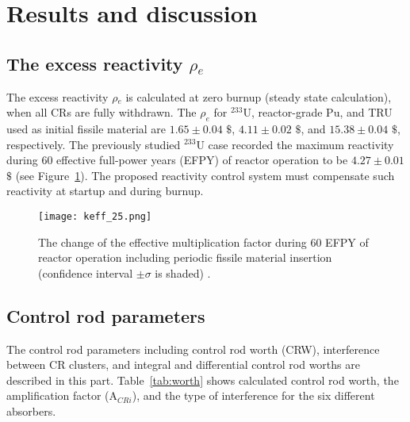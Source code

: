 \section{Results and discussion} \label{Results-and-discussion}

\subsection{The excess reactivity $\rho$$_e$}

The excess reactivity $\rho$$_e$ is calculated at zero burnup (steady state 
calculation), when all CRs are fully withdrawn. The $\rho_e$ for $^{233}$U, 
reactor-grade Pu, and TRU used as initial fissile material are $1.65\pm0.04$ 
$\$$, $4.11\pm0.02$ $\$$, and $15.38\pm0.04$ $\$$, respectively.
The previously studied $^{233}$U case recorded the maximum reactivity
during 60 effective full-power years (EFPY) of reactor operation to be 
$4.27\pm0.01$ $\$$ (see Figure~\ref{fig:keff_25}).
The proposed reactivity control system must compensate such reactivity at startup and during burnup.
\begin{figure}
	\centering
	\texttt{[image: keff\_25.png]}
	\vspace{-0.5in}
	\caption{The change of the effective multiplication factor during 60 EFPY of reactor operation including periodic fissile material insertion (confidence interval $\pm\sigma$ is shaded) \cite{ashraf2020whole}.} 
	\label{fig:keff_25}
\end{figure}

\subsection{Control rod parameters}

The control rod parameters including control rod worth (CRW), interference 
between CR clusters, and integral and differential control rod worths are 
described in this part. 
Table~\ref{tab:worth} shows calculated control rod worth, the amplification 
factor (A$_{CRi}$), and the type of interference for the six different 
absorbers.

